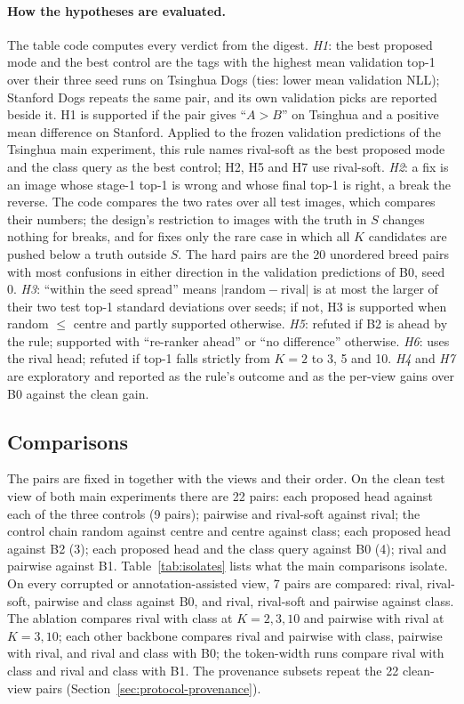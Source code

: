 \documentclass[11pt,a4paper]{article}
\theoremstyle{plain}
\newcommand{\fn}[1]{\texttt{\detokenize{#1}}}
\begin{document}
\paragraph{How the hypotheses are evaluated.} The table code computes every verdict from the digest.
\emph{H1}: the best proposed mode and the best control are the tags with the highest mean validation top-1 over their
three seed runs on Tsinghua Dogs (ties: lower mean validation NLL); Stanford Dogs repeats the same pair, and its own
validation picks are reported beside it. H1 is supported if the pair gives ``$A>B$'' on Tsinghua and a positive mean
difference on Stanford. Applied to the frozen validation predictions of the Tsinghua main experiment, this rule names
rival-soft as the best proposed mode and the class query as the best control; H2, H5 and H7 use rival-soft.
\emph{H2}: a fix is an image whose stage-1 top-1 is wrong and whose final top-1 is right, a break the reverse. The
code compares the two rates over all test images, which compares their numbers; the design's restriction to images
with the truth in $S$ changes nothing for breaks, and for fixes only the rare case in which all $K$ candidates are
pushed below a truth outside $S$. The hard pairs are the 20 unordered breed pairs with most confusions in either direction in the validation
predictions of B0, seed 0.
\emph{H3}: ``within the seed spread'' means $|\text{random}-\text{rival}|$ is at most the larger of their two test
top-1 standard deviations over seeds; if not, H3 is supported when random $\le$ centre and partly supported otherwise.
\emph{H5}: refuted if B2 is ahead by the rule; supported with ``re-ranker ahead'' or ``no difference'' otherwise.
\emph{H6}: uses the rival head; refuted if top-1 falls strictly from $K=2$ to 3, 5 and 10. \emph{H4} and \emph{H7} are
exploratory and reported as the rule's outcome and as the per-view gains over B0 against the clean gain.

\subsection{Comparisons}\label{sec:comparisons}
The pairs are fixed in \fn{scripts/final_all.sh} together with the views and their order.
On the clean test view of both main experiments there are 22 pairs: each proposed head against each of the three
controls (9 pairs); pairwise and rival-soft against rival; the control chain random against centre and centre against
class; each proposed head against B2 (3); each proposed head and the class query against B0 (4); rival and pairwise
against B1. Table~\ref{tab:isolates} lists what the main comparisons isolate. On every corrupted or
annotation-assisted view, 7 pairs are compared: rival, rival-soft, pairwise and class against B0, and rival,
rival-soft and pairwise against class. The ablation compares rival with class at $K=2,3,10$ and pairwise with rival at
$K=3,10$; each other backbone compares rival and pairwise with class, pairwise with rival, and rival and class with
B0; the token-width runs compare rival with class and rival and class with B1. The provenance subsets repeat the 22
clean-view pairs (Section~\ref{sec:protocol-provenance}).
\end{document}
